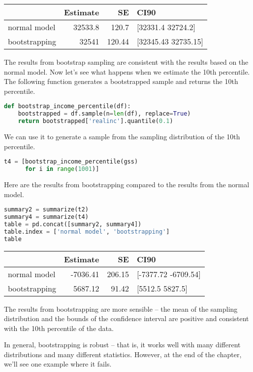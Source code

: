 \begin{tabular}{lrrl}
\toprule
 & Estimate & SE & CI90 \\
\midrule
normal model & 32533.8 & 120.7 & [32331.4 32724.2] \\
bootstrapping & 32541 & 120.44 & [32345.43 32735.15] \\
\bottomrule
\end{tabular}

The results from bootstrap sampling are consistent with the results
based on the normal model. Now let's see what happens when we estimate
the 10th percentile. The following function generates a bootstrapped
sample and returns the 10th percentile.

\begin{lstlisting}[language=Python,style=source]
def bootstrap_income_percentile(df):
    bootstrapped = df.sample(n=len(df), replace=True)
    return bootstrapped['realinc'].quantile(0.1)
\end{lstlisting}

We can use it to generate a sample from the sampling distribution of the
10th percentile.

\begin{lstlisting}[language=Python,style=source]
t4 = [bootstrap_income_percentile(gss)
      for i in range(1001)]
\end{lstlisting}

Here are the results from bootstrapping compared to the results from the
normal model.

\begin{lstlisting}[language=Python,style=source]
summary2 = summarize(t2)
summary4 = summarize(t4)
table = pd.concat([summary2, summary4])
table.index = ['normal model', 'bootstrapping']
table
\end{lstlisting}

\begin{tabular}{lrrl}
\toprule
 & Estimate & SE & CI90 \\
\midrule
normal model & -7036.41 & 206.15 & [-7377.72 -6709.54] \\
bootstrapping & 5687.12 & 91.42 & [5512.5 5827.5] \\
\bottomrule
\end{tabular}

The results from bootstrapping are more sensible -- the mean of the
sampling distribution and the bounds of the confidence interval are
positive and consistent with the 10th percentile of the data.

In general, bootstrapping is robust -- that is, it works well with many
different distributions and many different statistics. However, at the
end of the chapter, we'll see one example where it fails.

